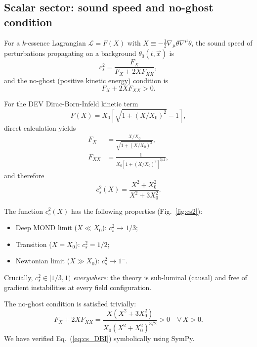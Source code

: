 \documentclass[aps,prd,reprint,floatfix,nofootinbib,superscriptaddress]{revtex4-2}
\newcommand{\Xzero}{X_0}
\newcommand{\cs}{c_s}
\begin{document}
\subsection{Scalar sector: sound speed and no-ghost condition}

For a $k$-essence Lagrangian $\mathcal{L} = F(X)$ with
$X \equiv -\frac{1}{2}\nabla_\mu\theta\nabla^\mu\theta$, the sound
speed of perturbations propagating on a background $\theta_0(t,\vec{x})$
is~\cite{ArmendarizPicon1999}
\begin{equation}
  \cs^2 = \frac{F_X}{F_X + 2X F_{XX}},
  \label{eq:cs_general}
\end{equation}
and the no-ghost (positive kinetic energy) condition is
\begin{equation}
  F_X + 2X F_{XX} > 0.
  \label{eq:noghost_general}
\end{equation}

For the DEV Dirac-Born-Infeld kinetic term
\begin{equation}
  F(X) = \Xzero\!\left[\sqrt{1 + (X/\Xzero)^2} - 1\right],
\end{equation}
direct calculation yields
\begin{align}
  F_X &= \frac{X/\Xzero}{\sqrt{1+(X/\Xzero)^2}}, \\
  F_{XX} &= \frac{1}{\Xzero[1+(X/\Xzero)^2]^{3/2}},
\end{align}
and therefore
\begin{equation}
  \boxed{\cs^2(X) = \frac{X^2 + \Xzero^2}{X^2 + 3\Xzero^2}.}
  \label{eq:cs_DBI}
\end{equation}

The function $\cs^2(X)$ has the following properties (Fig.~\ref{fig:cs2}):
\begin{itemize}
  \item Deep MOND limit ($X\ll\Xzero$): $\cs^2 \to 1/3$;
  \item Transition ($X = \Xzero$): $\cs^2 = 1/2$;
  \item Newtonian limit ($X\gg\Xzero$): $\cs^2 \to 1^-$.
\end{itemize}
Crucially, $\cs^2 \in [1/3,1)$ \emph{everywhere}: the theory is
sub-luminal (causal) and free of gradient instabilities at every
field configuration.

The no-ghost condition is satisfied trivially:
\begin{equation}
  F_X + 2X F_{XX}
   = \frac{X(X^2 + 3\Xzero^2)}{\Xzero(X^2+\Xzero^2)^{3/2}} > 0
  \quad \forall\,X>0.
\end{equation}
We have verified Eq.~(\ref{eq:cs_DBI}) symbolically using SymPy.
\end{document}
